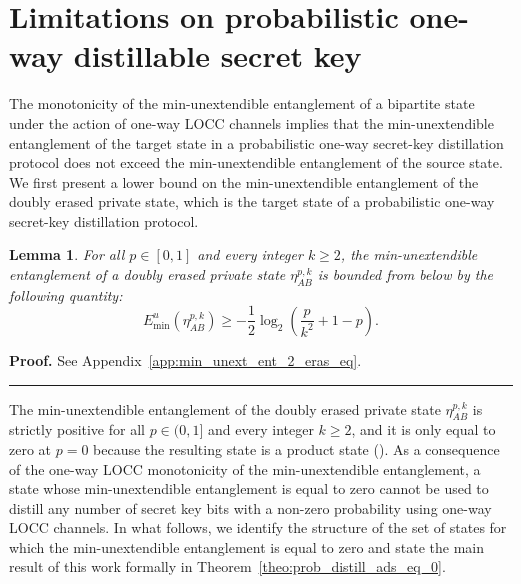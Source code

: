 \documentclass[twocolumn,letterpaper, dvipsnames,allowtoday, accepted = 2025-12-31]{quantumarticle}
\newtheorem{lemma}{Lemma}
\newenvironment{proof}[1][Proof]{\noindent\textbf{#1.} }{\ \rule{0.5em}{0.5em}}
\begin{document}
\section{Limitations on probabilistic one-way distillable secret key}

The monotonicity of the min-unextendible entanglement of a bipartite state under the action of one-way LOCC channels implies that the min-unextendible entanglement of the target state in a probabilistic one-way secret-key distillation protocol does not exceed the min-unextendible entanglement of the source state. We first present a lower bound on the min-unextendible entanglement of the doubly erased private state, which is the target state of a probabilistic one-way secret-key distillation protocol.

\begin{lemma}\label{lem:min_unext_ent_2_eras_eq}
    For all $p \in [0,1]$ and every integer $k \geq 2$, the min-unextendible entanglement of a doubly erased private state $\eta^{p,k}_{AB}$ is bounded from below by the following quantity:
    \begin{equation}
        E^u_{\min}\!\left(\eta^{p,k}_{AB}\right) \ge -\frac{1}{2}\log_2\!\left(\frac{p}{k^2} + 1-p\right)  .
    \end{equation}
\end{lemma}
\begin{proof}
    See Appendix~\ref{app:min_unext_ent_2_eras_eq}.
\end{proof}

\medskip

The min-unextendible entanglement of the doubly erased private state $\eta^{p,k}_{AB}$  is strictly positive for all $p \in (0,1]$ and every integer $k\ge 2$, and it is only equal to zero at $p=0$ because the resulting state is a product state (\cite[Proposition~3]{WWW21}). As a consequence of the one-way LOCC monotonicity of the min-unextendible entanglement, a state whose min-unextendible entanglement is equal to zero cannot be used to distill any number of secret key bits with a non-zero probability using one-way LOCC channels. In what follows, we identify the structure of the set of states for which the min-unextendible entanglement is equal to zero and state the main result of this work formally in Theorem~\ref{theo:prob_distill_ads_eq_0}.
\end{document}
